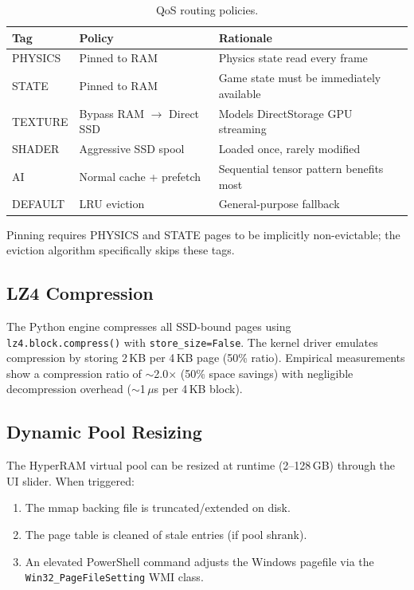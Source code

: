 \documentclass[11pt,a4paper]{article}
\newcommand{\code}[1]{\texttt{#1}}
\newcommand{\micro}{$\mu$}
\begin{document}
\begin{table}[htbp]
\centering
\caption{QoS routing policies.}
\label{tab:qos}
\begin{tabular}{lll}
\toprule
\textbf{Tag} & \textbf{Policy} & \textbf{Rationale} \\
\midrule
PHYSICS & Pinned to RAM & Physics state read every frame \\
STATE & Pinned to RAM & Game state must be immediately available \\
TEXTURE & Bypass RAM $\to$ Direct SSD & Models DirectStorage GPU streaming \\
SHADER & Aggressive SSD spool & Loaded once, rarely modified \\
AI & Normal cache + prefetch & Sequential tensor pattern benefits most \\
DEFAULT & LRU eviction & General-purpose fallback \\
\bottomrule
\end{tabular}
\end{table}

Pinning requires PHYSICS and STATE pages to be implicitly non-evictable; the eviction algorithm specifically skips these tags.

\subsection{LZ4 Compression}
\label{sec:compression}

The Python engine compresses all SSD-bound pages using \code{lz4.block.compress()} with \code{store\_size=False}. The kernel driver emulates compression by storing 2\,KB per 4\,KB page (50\% ratio). Empirical measurements show a compression ratio of $\sim$2.0$\times$ (50\% space savings) with negligible decompression overhead ($\sim$1\,\micro{}s per 4\,KB block).

\subsection{Dynamic Pool Resizing}
\label{sec:resize}

The HyperRAM virtual pool can be resized at runtime (2--128\,GB) through the UI slider. When triggered:

\begin{enumerate}[nosep]
    \item The mmap backing file is truncated/extended on disk.
    \item The page table is cleaned of stale entries (if pool shrank).
    \item An elevated PowerShell command adjusts the Windows pagefile via the \code{Win32\_PageFileSetting} WMI class.
\end{enumerate}
\end{document}
